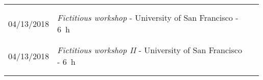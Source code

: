 \documentclass[11pt, letterpaper]{extarticle}
\begin{document}
	\begin{longtable}{C{0.154\linewidth}C{0.834\linewidth}N}
		                                                             &                                                                                                                                                                                                                                                  & \\[-0.25cm]
		                                                             &                                                                                                                                                                                                                                                  & \\[-0.25cm]
		04/13/2018                                                   & \textit{Fictitious workshop} - University of San Francisco - 6~h                                                                                                                                                                                 & \\
		                                                             &                                                                                                                                                                                                                                                  & \\[-0.25cm]
		                                                             &                                                                                                                                                                                                                                                  & \\[-0.25cm]
		04/13/2018                                                   & \textit{Fictitious workshop II} - University of San Francisco - 6~h                                                                                                                                                                              & \\
		                                                             &                                                                                                                                                                                                                                                  & \\[-0.25cm]
		                                                             &                                                                                                                                                                                                                                                  & \\[-0.25cm] \hline
	\end{longtable}
\end{document}
